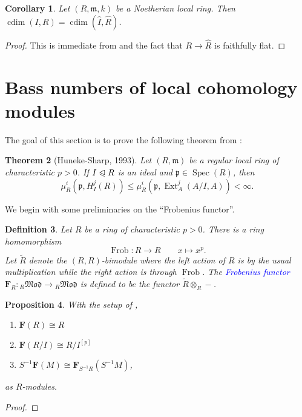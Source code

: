 \documentclass[10pt]{article}
\theoremstyle{thmstyle}
\newtheorem{theorem}{Theorem}[section]
\newtheorem{proposition}[theorem]{Proposition}
\theoremstyle{defstyle}
\newtheorem{definition}[theorem]{Definition}
\newtheorem{corollary}[theorem]{Corollary}
\newcommand{\Spec}{\operatorname{Spec}}
\newcommand{\frakm}{\mathfrak{m}} %
\newcommand{\frakp}{\mathfrak{p}} %
\newcommand{\wt}[1]{\widetilde{#1}}
\newcommand{\wh}[1]{\widehat{#1}}
\newcommand{\define}[1]{\textcolor{blue}{\textit{#1}}}
\renewcommand{\le}{\leqslant}
\newcommand{\Ext}{\operatorname{Ext}}
\newcommand{\bfF}{\mathbf{F}} %
\newcommand{\noreq}{\trianglelefteqslant}
\newcommand{\cdim}{\operatorname{cdim}}
\begin{document}
\begin{corollary}
	Let $(R,\frakm, k)$ be a Noetherian local ring. Then $\cdim(I, R) = \cdim(\wh I,\wh R)$.
\end{corollary}
\begin{proof}
	This is immediate from  and the fact that $R\to\wh R$ is faithfully flat.
\end{proof}

\section{Bass numbers of local cohomology modules}

The goal of this section is to prove the following theorem from \cite{huneke-sharp}:

\begin{theorem}[Huneke-Sharp, 1993]
	Let $(R,\frakm)$ be a regular local ring of characteristic $p > 0$. If $I\noreq R$ is an ideal and $\frakp\in\Spec(R)$, then 
	\begin{equation*}
		\mu^i_R\left(\frakp, H^j_I(R)\right)\le\mu^i_R\left(\frakp,\Ext^j_A\left(A/I, A\right)\right) < \infty.
	\end{equation*}
\end{theorem}

We begin with some preliminaries on the ``Frobenius functor''.

\begin{definition}
	Let $R$ be a ring of characteristic $p > 0$. There is a ring homomorphism
	\begin{equation*}
		\operatorname{Frob}: R\to R\qquad x\mapsto x^p.
	\end{equation*}
	Let $\wt R$ denote the $(R, R)$-bimodule where the left action of $R$ is by the usual multiplication while the right action is through $\operatorname{Frob}$. The \define{Frobenius functor} $\bfF_R: {}_R\mathfrak{Mod}\to{}_R\mathfrak{Mod}$ is defined to be the functor $\wt R\otimes_R -$.
\end{definition}

\begin{proposition}
	With the setup of , 
	\begin{enumerate}[label=(\arabic*)]
		\item $\bfF(R)\cong R$
		\item $\bfF\left(R/I\right)\cong R/I^{[p]}$
		\item $S^{-1}\bfF(M)\cong\bfF_{S^{-1}R}(S^{-1}M)$,
	\end{enumerate}
	as $R$-modules.
\end{proposition}
\begin{proof}
	
\end{proof}
\end{document}
